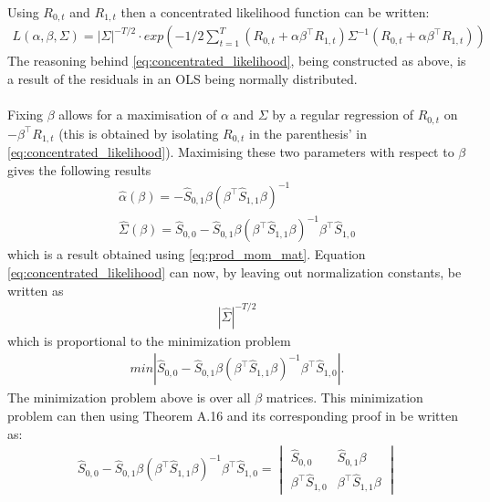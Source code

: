 \begin{bevis}
    Using $R_{0,t}$ and $R_{1,t}$ then a concentrated likelihood function can be written:
    \begin{align}\label{eq:concentrated_likelihood}
        L(\alpha,\beta,\Sigma)=|\Sigma|^{-T/2}\cdot exp\left(-1/2\sum_{t=1}^T\left(R_{0,t}+\alpha\beta^{\top} R_{1,t}\right)\Sigma^{-1}\left(R_{0,t}+\alpha\beta^{\top} R_{1,t}\right)\right)
    \end{align}
    The reasoning behind \eqref{eq:concentrated_likelihood}, being constructed as above, is a result of the residuals in an OLS being normally distributed.\\\\
 Fixing $\beta$ allows for a maximisation of $\alpha$ and $\Sigma$ by a regular regression of $R_{0,t}$ on $-\beta^\top R_{1,t}$ (this is obtained by isolating $R_{0,t}$ in the parenthesis' in \eqref{eq:concentrated_likelihood}). Maximising these two parameters with respect to $\beta$ gives the following results
 \begin{align}\label{eq:max_alphaandsigma}
     \hat{\alpha}(\beta)=-\hat{S}_{0,1}\beta(\beta^\top \hat{S}_{1,1}\beta)^{-1}\\
     \hat{\Sigma}(\beta)=\hat{S}_{0,0}-\hat{S}_{0,1}\beta\left(\beta^\top \hat{S}_{1,1}\beta\right)^{-1}\beta^\top \hat{S}_{1,0}
 \end{align}
 which is a result obtained using \eqref{eq:prod_mom_mat}. Equation \eqref{eq:concentrated_likelihood} can now, by leaving out normalization constants, be written as
 \begin{align*}
     |\hat{\Sigma}|^{-T/2}
 \end{align*}
 which is proportional to the minimization problem
 \begin{align}
     min|\hat{S}_{0,0}-\hat{S}_{0,1}\beta\left(\beta^\top \hat{S}_{1,1}\beta\right)^{-1}\beta^\top \hat{S}_{1,0}|.%
 \end{align}
 The minimization problem above is over all $\beta$ matrices. This minimization problem can then using Theorem A.16 and its corresponding proof in \cite{Linear_Models:_Least_Squares_and_Alternatives_Second_Edition} be written as:
 \begin{align*}
     \hat{S}_{0,0}-\hat{S}_{0,1}\beta\left(\beta^\top \hat{S}_{1,1}\beta\right)^{-1}\beta^\top \hat{S}_{1,0}=\begin{vmatrix}
         \hat{S}_{0,0}&\hat{S}_{0,1}\beta\\
         \beta^{\top}\hat{S}_{1,0}&\beta^{\top} \hat{S}_{1,1}\beta\end{vmatrix}\\

\end{align*}
\end{bevis}
